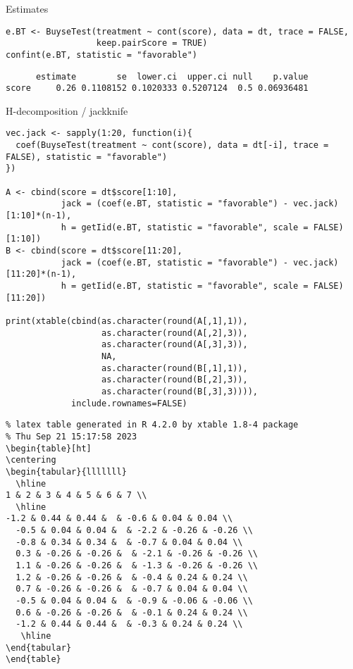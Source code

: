 \documentclass[12pt]{article}
\begin{document}
Estimates
\lstset{language=r,label= ,caption= ,captionpos=b,numbers=none}
\begin{lstlisting}
e.BT <- BuyseTest(treatment ~ cont(score), data = dt, trace = FALSE,
                  keep.pairScore = TRUE)
confint(e.BT, statistic = "favorable")
\end{lstlisting}

\begin{verbatim}
      estimate        se  lower.ci  upper.ci null    p.value
score     0.26 0.1108152 0.1020333 0.5207124  0.5 0.06936481
\end{verbatim}


H-decomposition / jackknife
\lstset{language=r,label= ,caption= ,captionpos=b,numbers=none}
\begin{lstlisting}
vec.jack <- sapply(1:20, function(i){
  coef(BuyseTest(treatment ~ cont(score), data = dt[-i], trace = FALSE), statistic = "favorable")
})

A <- cbind(score = dt$score[1:10],
           jack = (coef(e.BT, statistic = "favorable") - vec.jack)[1:10]*(n-1),
           h = getIid(e.BT, statistic = "favorable", scale = FALSE)[1:10])
B <- cbind(score = dt$score[11:20],
           jack = (coef(e.BT, statistic = "favorable") - vec.jack)[11:20]*(n-1),
           h = getIid(e.BT, statistic = "favorable", scale = FALSE)[11:20])

print(xtable(cbind(as.character(round(A[,1],1)),
                   as.character(round(A[,2],3)),
                   as.character(round(A[,3],3)),
                   NA,
                   as.character(round(B[,1],1)),
                   as.character(round(B[,2],3)),
                   as.character(round(B[,3],3)))),
             include.rownames=FALSE)
\end{lstlisting}

\begin{verbatim}
% latex table generated in R 4.2.0 by xtable 1.8-4 package
% Thu Sep 21 15:17:58 2023
\begin{table}[ht]
\centering
\begin{tabular}{lllllll}
  \hline
1 & 2 & 3 & 4 & 5 & 6 & 7 \\ 
  \hline
-1.2 & 0.44 & 0.44 &  & -0.6 & 0.04 & 0.04 \\ 
  -0.5 & 0.04 & 0.04 &  & -2.2 & -0.26 & -0.26 \\ 
  -0.8 & 0.34 & 0.34 &  & -0.7 & 0.04 & 0.04 \\ 
  0.3 & -0.26 & -0.26 &  & -2.1 & -0.26 & -0.26 \\ 
  1.1 & -0.26 & -0.26 &  & -1.3 & -0.26 & -0.26 \\ 
  1.2 & -0.26 & -0.26 &  & -0.4 & 0.24 & 0.24 \\ 
  0.7 & -0.26 & -0.26 &  & -0.7 & 0.04 & 0.04 \\ 
  -0.5 & 0.04 & 0.04 &  & -0.9 & -0.06 & -0.06 \\ 
  0.6 & -0.26 & -0.26 &  & -0.1 & 0.24 & 0.24 \\ 
  -1.2 & 0.44 & 0.44 &  & -0.3 & 0.24 & 0.24 \\ 
   \hline
\end{tabular}
\end{table}
\end{verbatim}
\end{document}
